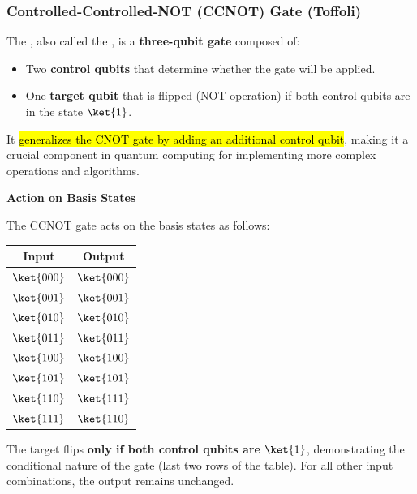 \subsubsection{Controlled-Controlled-NOT (CCNOT) Gate (Toffoli)}

The , also called the , is a \textbf{three-qubit gate} composed of:
\begin{itemize}
    \item Two \textbf{control qubits} that determine whether the gate will be applied.
    \item One \textbf{target qubit} that is flipped (NOT operation) if both control qubits are in the state $\ket{1}$.
\end{itemize}
It \hl{generalizes the CNOT gate by adding an additional control qubit}, making it a crucial component in quantum computing for implementing more complex operations and algorithms.

\highspace
\begin{flushleft}
    \textcolor{Green3}{ \textbf{Action on Basis States}}
\end{flushleft}
The CCNOT gate acts on the basis states as follows:

\begin{table}[!htp]
    \centering
    \begin{tabular}{@{} c | c @{}}
        \toprule
        \textbf{Input} & \textbf{Output} \\
        \midrule
        $\ket{000}$ & $\ket{000}$ \\
        $\ket{001}$ & $\ket{001}$ \\
        $\ket{010}$ & $\ket{010}$ \\
        $\ket{011}$ & $\ket{011}$ \\
        $\ket{100}$ & $\ket{100}$ \\
        $\ket{101}$ & $\ket{101}$ \\
        $\ket{110}$ & $\ket{111}$ \\
        $\ket{111}$ & $\ket{110}$ \\
        \bottomrule
    \end{tabular}
\end{table}

\noindent
The target flips \textbf{only if both control qubits are $\ket{1}$}, demonstrating the conditional nature of the gate (last two rows of the table). For all other input combinations, the output remains unchanged.

